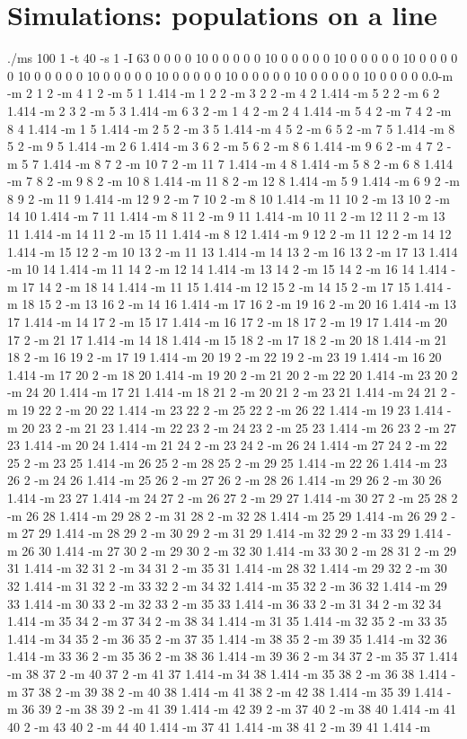 \documentclass[12pt]{article}
\begin{document}
\section*{Simulations: populations on a line}
./ms 100 1 -t 40 -s 1 -I 63 0 0 0 0 10 0 0 0 0 0 10 0 0 0 0 0 10 0 0 0 0 0 10 0 0 0 0 0 10 0 0 0 0 0 10 0 0 0 0 0 10 0 0 0 0 0 10 0 0 0 0 0 10 0 0 0 0 0 10 0 0 0 0 0.0-m -m 2 1 2 -m 4 1 2 -m 5 1 1.414 -m 1 2 2 -m 3 2 2 -m 4 2 1.414 -m 5 2 2 -m 6 2 1.414 -m 2 3 2 -m 5 3 1.414 -m 6 3 2 -m 1 4 2 -m 2 4 1.414 -m 5 4 2 -m 7 4 2 -m 8 4 1.414 -m 1 5 1.414 -m 2 5 2 -m 3 5 1.414 -m 4 5 2 -m 6 5 2 -m 7 5 1.414 -m 8 5 2 -m 9 5 1.414 -m 2 6 1.414 -m 3 6 2 -m 5 6 2 -m 8 6 1.414 -m 9 6 2 -m 4 7 2 -m 5 7 1.414 -m 8 7 2 -m 10 7 2 -m 11 7 1.414 -m 4 8 1.414 -m 5 8 2 -m 6 8 1.414 -m 7 8 2 -m 9 8 2 -m 10 8 1.414 -m 11 8 2 -m 12 8 1.414 -m 5 9 1.414 -m 6 9 2 -m 8 9 2 -m 11 9 1.414 -m 12 9 2 -m 7 10 2 -m 8 10 1.414 -m 11 10 2 -m 13 10 2 -m 14 10 1.414 -m 7 11 1.414 -m 8 11 2 -m 9 11 1.414 -m 10 11 2 -m 12 11 2 -m 13 11 1.414 -m 14 11 2 -m 15 11 1.414 -m 8 12 1.414 -m 9 12 2 -m 11 12 2 -m 14 12 1.414 -m 15 12 2 -m 10 13 2 -m 11 13 1.414 -m 14 13 2 -m 16 13 2 -m 17 13 1.414 -m 10 14 1.414 -m 11 14 2 -m 12 14 1.414 -m 13 14 2 -m 15 14 2 -m 16 14 1.414 -m 17 14 2 -m 18 14 1.414 -m 11 15 1.414 -m 12 15 2 -m 14 15 2 -m 17 15 1.414 -m 18 15 2 -m 13 16 2 -m 14 16 1.414 -m 17 16 2 -m 19 16 2 -m 20 16 1.414 -m 13 17 1.414 -m 14 17 2 -m 15 17 1.414 -m 16 17 2 -m 18 17 2 -m 19 17 1.414 -m 20 17 2 -m 21 17 1.414 -m 14 18 1.414 -m 15 18 2 -m 17 18 2 -m 20 18 1.414 -m 21 18 2 -m 16 19 2 -m 17 19 1.414 -m 20 19 2 -m 22 19 2 -m 23 19 1.414 -m 16 20 1.414 -m 17 20 2 -m 18 20 1.414 -m 19 20 2 -m 21 20 2 -m 22 20 1.414 -m 23 20 2 -m 24 20 1.414 -m 17 21 1.414 -m 18 21 2 -m 20 21 2 -m 23 21 1.414 -m 24 21 2 -m 19 22 2 -m 20 22 1.414 -m 23 22 2 -m 25 22 2 -m 26 22 1.414 -m 19 23 1.414 -m 20 23 2 -m 21 23 1.414 -m 22 23 2 -m 24 23 2 -m 25 23 1.414 -m 26 23 2 -m 27 23 1.414 -m 20 24 1.414 -m 21 24 2 -m 23 24 2 -m 26 24 1.414 -m 27 24 2 -m 22 25 2 -m 23 25 1.414 -m 26 25 2 -m 28 25 2 -m 29 25 1.414 -m 22 26 1.414 -m 23 26 2 -m 24 26 1.414 -m 25 26 2 -m 27 26 2 -m 28 26 1.414 -m 29 26 2 -m 30 26 1.414 -m 23 27 1.414 -m 24 27 2 -m 26 27 2 -m 29 27 1.414 -m 30 27 2 -m 25 28 2 -m 26 28 1.414 -m 29 28 2 -m 31 28 2 -m 32 28 1.414 -m 25 29 1.414 -m 26 29 2 -m 27 29 1.414 -m 28 29 2 -m 30 29 2 -m 31 29 1.414 -m 32 29 2 -m 33 29 1.414 -m 26 30 1.414 -m 27 30 2 -m 29 30 2 -m 32 30 1.414 -m 33 30 2 -m 28 31 2 -m 29 31 1.414 -m 32 31 2 -m 34 31 2 -m 35 31 1.414 -m 28 32 1.414 -m 29 32 2 -m 30 32 1.414 -m 31 32 2 -m 33 32 2 -m 34 32 1.414 -m 35 32 2 -m 36 32 1.414 -m 29 33 1.414 -m 30 33 2 -m 32 33 2 -m 35 33 1.414 -m 36 33 2 -m 31 34 2 -m 32 34 1.414 -m 35 34 2 -m 37 34 2 -m 38 34 1.414 -m 31 35 1.414 -m 32 35 2 -m 33 35 1.414 -m 34 35 2 -m 36 35 2 -m 37 35 1.414 -m 38 35 2 -m 39 35 1.414 -m 32 36 1.414 -m 33 36 2 -m 35 36 2 -m 38 36 1.414 -m 39 36 2 -m 34 37 2 -m 35 37 1.414 -m 38 37 2 -m 40 37 2 -m 41 37 1.414 -m 34 38 1.414 -m 35 38 2 -m 36 38 1.414 -m 37 38 2 -m 39 38 2 -m 40 38 1.414 -m 41 38 2 -m 42 38 1.414 -m 35 39 1.414 -m 36 39 2 -m 38 39 2 -m 41 39 1.414 -m 42 39 2 -m 37 40 2 -m 38 40 1.414 -m 41 40 2 -m 43 40 2 -m 44 40 1.414 -m 37 41 1.414 -m 38 41 2 -m 39 41 1.414 -m 
\end{document}
